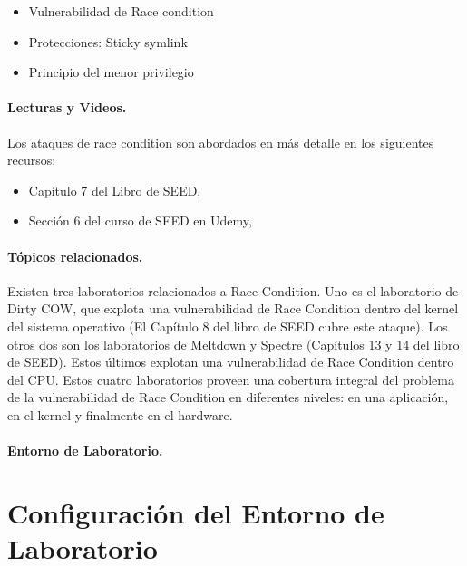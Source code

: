 \begin{itemize}[noitemsep]
\item Vulnerabilidad de Race condition
\item Protecciones: Sticky symlink
\item Principio del menor privilegio
\end{itemize}




\paragraph{Lecturas y Videos.}
Los ataques de race condition son abordados en más detalle en los siguientes recursos:

\begin{itemize}
\item Capítulo 7 del Libro de SEED, \seedbook
\item Sección 6 del curso de SEED en Udemy, \seedcsvideo
\end{itemize}


\paragraph{Tópicos relacionados.}
Existen tres laboratorios relacionados a Race Condition. Uno es el laboratorio de Dirty COW, que explota una vulnerabilidad de Race Condition dentro del kernel del sistema operativo (El Capítulo 8 del libro de SEED cubre este ataque). Los otros dos son los laboratorios de Meltdown y Spectre (Capítulos 13 y 14 del libro de SEED). Estos últimos explotan una vulnerabilidad de Race Condition dentro del CPU. Estos cuatro laboratorios proveen una cobertura integral del problema de la vulnerabilidad de Race Condition en diferentes niveles: en una aplicación, en el kernel y finalmente en el hardware.


\paragraph{Entorno de Laboratorio.} \seedenvironmentC


\section{Configuración del Entorno de Laboratorio}

